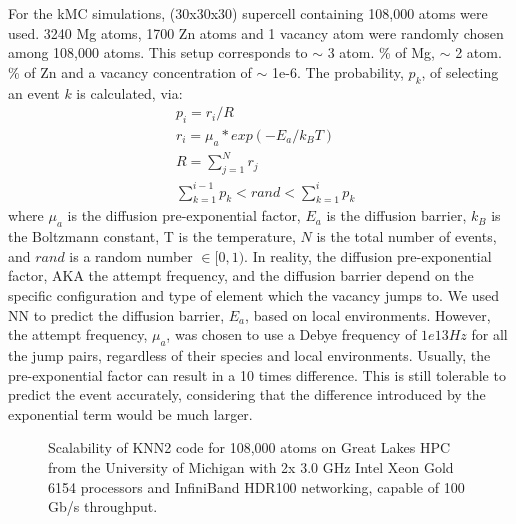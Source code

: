 For the \ac{kMC} simulations, (30x30x30) supercell containing 108,000 atoms were used. 3240 Mg atoms, 1700 Zn atoms and 1 vacancy atom were randomly chosen among 108,000 atoms. This setup corresponds to $\sim$ 3 atom. \% of Mg, $\sim$ 2 atom. \% of Zn and a vacancy concentration of $\sim$ 1e-6. The probability, $p_k$, of selecting an event $k$ is calculated, via:
\begin{subequations}
\begin{align}
& p_i = r_i / R    \label{Chap:Al/Vac:eq:prob} \\
& r_i = \mu_a * exp(- E_a / k_B T)  \label{Chap:Al/Vac:eq:rate} \\
& R = \sum_{j=1}^N r_j \label{Chap:Al/Vac:eq:R} \\
& \sum_{k=1}^{i-1} p_k < rand < \sum_{k=1}^{i} p_k \label{Chap:Al/Vac:eq:choice}
\end{align}
\end{subequations}
where $\mu_a$ is the diffusion pre-exponential factor, $E_a$ is the diffusion barrier, $k_B$ is the Boltzmann constant, T is the temperature, $N$ is the total number of events, and $rand$ is a random number $\in [0, 1)$. In reality, the diffusion pre-exponential factor, AKA the attempt frequency, and the diffusion barrier depend on the specific configuration \cite{osti_323431,van2001first,le2002kinetic} and type of element which the vacancy jumps to\cite{clouet2004nucleation}. We used \ac{NN} to predict the diffusion barrier, $E_a$, based on local environments. However, the attempt frequency, $\mu_a$, was chosen to use a Debye frequency of $1e13 Hz$ for all the jump pairs, regardless of their species and local environments. Usually, the pre-exponential factor can result in a 10 times difference. This is still tolerable to predict the event accurately, considering that the difference introduced by the exponential term would be much larger.


\begingroup
\begin{figure}[!ht]
  \centering
\caption[Scalability of KNN2 code on Great Lakes HPC.]{Scalability of KNN2 code for 108,000 atoms on Great Lakes HPC from the University of Michigan with 2x 3.0 GHz Intel Xeon Gold 6154 processors and InfiniBand HDR100 networking, capable of 100 Gb/s throughput.}
\label{Chap:Al/Vac:fig:scale}
\end{figure}
\endgroup


